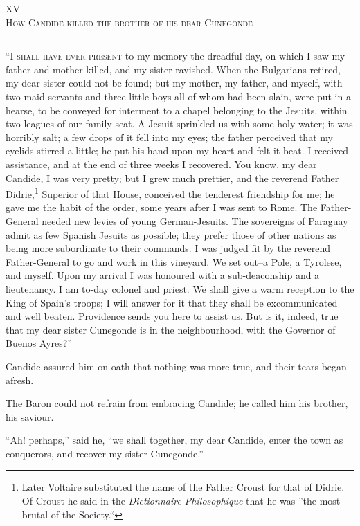 \begin{center}
XV\\
\textsc{How Candide killed the brother of his dear Cunegonde}
\end{center}
\vspace{-0.5cm}
\rule{\textwidth}{0.5pt}
\lettrine{``I}{ shall have ever present} to my memory the dreadful day, on which I saw my father and mother killed, and my sister ravished. When the Bulgarians retired, my dear sister could not be found; but my mother, my father, and myself, with two maid-servants and three little boys all of whom had been slain, were put in a hearse, to be conveyed for interment to a chapel belonging to the Jesuits, within two leagues of our family seat. A Jesuit sprinkled us with some holy water; it was horribly salt; a few drops of it fell into my eyes; the father perceived that my eyelids stirred a little; he put his hand upon my heart and felt it beat. I received assistance, and at the end of three weeks I recovered. You know, my dear Candide, I was very pretty; but I grew much prettier, and the reverend Father Didrie,\footnote{Later Voltaire substituted the name of the Father Croust for that of Didrie. Of Croust he said in the \textit{Dictionnaire Philosophique} that he was ''the most brutal of the Society.``} Superior of that House, conceived the tenderest friendship for me; he gave me the habit of the order, some years after I was sent to Rome. The Father-General needed new levies of young German-Jesuits. The sovereigns of Paraguay admit as few Spanish Jesuits as possible; they prefer those of other nations as being more subordinate to their commands. I was judged fit by the reverend Father-General to go and work in this vineyard. We set out--a Pole, a Tyrolese, and myself. Upon my arrival I was honoured with a sub-deaconship and a lieutenancy. I am to-day colonel and priest. We shall give a warm reception to the King of Spain's troops; I will answer for it that they shall be excommunicated and well beaten. Providence sends you here to assist us. But is it, indeed, true that my dear sister Cunegonde is in the neighbourhood, with the Governor of Buenos Ayres?''

Candide assured him on oath that nothing was more true, and their tears began afresh.

The Baron could not refrain from embracing Candide; he called him his brother, his saviour.

``Ah! perhaps,'' said he, ``we shall together, my dear Candide, enter the town as conquerors, and recover my sister Cunegonde.''

